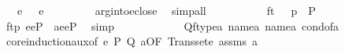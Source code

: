 \begin{isabellebody}
\ {\isachardoublequoteopen}{\isasymtau}\ {\isasymin}\ {\isacharquery}{\kern0pt}e{\isachardoublequoteclose}\ {\isachardoublequoteopen}{\isasymtheta}\ {\isasymin}\ {\isacharquery}{\kern0pt}e{\isachardoublequoteclose}\ \isanewline
\ \ \ \ \ \ \isamarkupfalse%
\ arg{\isacharunderscore}{\kern0pt}into{\isacharunderscore}{\kern0pt}eclose\ \isamarkupfalse%
\ simp{\isacharunderscore}{\kern0pt}all\isanewline
\ \ \ \ \isamarkupfalse%
\isanewline
\ \ \ \ \isamarkupfalse%
\ {\isachardoublequoteopen}ft\ {\isasymin}\ {}{\isachardoublequoteclose}\ {\isachardoublequoteopen}p\ {\isasymin}\ P{\isachardoublequoteclose}\isanewline
\ \ \ \ \isamarkupfalse%
\isanewline
\ \ \ \ \isamarkupfalse%
\ {\isachardoublequoteopen}{\isasymlangle}ft{\isacharcomma}{\kern0pt}{\isasymtau}{\isacharcomma}{\kern0pt}{\isasymtheta}{\isacharcomma}{\kern0pt}p{\isasymrangle}{\isasymin}\ {}{\isasymtimes}{\isacharquery}{\kern0pt}e{\isasymtimes}{\isacharquery}{\kern0pt}e{\isasymtimes}P{\isachardoublequoteclose}\ {\isacharparenleft}{\kern0pt}\ {\isachardoublequoteopen}{\isacharquery}{\kern0pt}a{\isasymin}{}{\isasymtimes}{\isacharquery}{\kern0pt}e{\isasymtimes}{\isacharquery}{\kern0pt}e{\isasymtimes}P{\isachardoublequoteclose}{\isacharparenright}{\kern0pt}\ \isamarkupfalse%
\ simp\isanewline
\ \ \ \ \isamarkupfalse%
\ \isanewline
\ \ \ \ \isamarkupfalse%
\ {\isachardoublequoteopen}Q{\isacharparenleft}{\kern0pt}ftype{\isacharparenleft}{\kern0pt}{\isacharquery}{\kern0pt}a{\isacharparenright}{\kern0pt}{\isacharcomma}{\kern0pt}\ name{}{\isacharparenleft}{\kern0pt}{\isacharquery}{\kern0pt}a{\isacharparenright}{\kern0pt}{\isacharcomma}{\kern0pt}\ name{}{\isacharparenleft}{\kern0pt}{\isacharquery}{\kern0pt}a{\isacharparenright}{\kern0pt}{\isacharcomma}{\kern0pt}\ cond{\isacharunderscore}{\kern0pt}of{\isacharparenleft}{\kern0pt}{\isacharquery}{\kern0pt}a{\isacharparenright}{\kern0pt}{\isacharparenright}{\kern0pt}{\isachardoublequoteclose}\isanewline
\ \ \ \ \ \ \isamarkupfalse%
\ core{\isacharunderscore}{\kern0pt}induction{\isacharunderscore}{\kern0pt}aux{\isacharbrackleft}{\kern0pt}of\ {\isacharquery}{\kern0pt}e\ P\ Q\ {\isacharquery}{\kern0pt}a{\isacharcomma}{\kern0pt}OF\ {\isacartoucheopen}Transset{\isacharparenleft}{\kern0pt}{\isacharquery}{\kern0pt}e{\isacharparenright}{\kern0pt}{\isacartoucheclose}\ assms{\isacharparenleft}{\kern0pt}{}{\isacharcomma}{\kern0pt}{}{\isacharparenright}{\kern0pt}\ {\isacartoucheopen}{\isacharquery}{\kern0pt}a{\isasymin}{\isacharunderscore}{\kern0pt}{\isacartoucheclose}{\isacharbrackright}{\kern0pt}\ \isanewline

\end{isabellebody}
